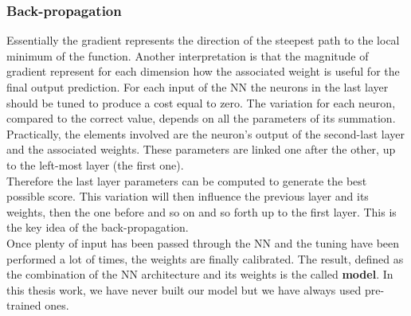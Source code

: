 \subsubsection*{Back-propagation}
Essentially the gradient represents the direction of the steepest path to the local minimum of the function. Another interpretation is that the magnitude of gradient represent for each dimension how the associated weight is useful for the final output prediction. For each input of the NN the neurons in the last layer should be tuned to produce a cost equal to zero. The variation for each neuron, compared to the correct value, depends on all the parameters of its summation. Practically, the elements involved are the neuron's output of the second-last layer and the associated weights. These parameters are linked one after the other, up to the left-most layer (the first one).\\
Therefore the last layer parameters can be computed to generate the best possible score. This variation will then influence the previous layer and its weights, then the one before and so on and so forth up to the first layer. This is the key idea of the back-propagation.\\
Once plenty of input has been passed through the NN and the tuning have been performed a lot of times, the weights are finally calibrated. The result, defined as the combination of the NN architecture and its weights is the called \textbf{model}. In this thesis work, we have never built our model but we have always used pre-trained ones.


